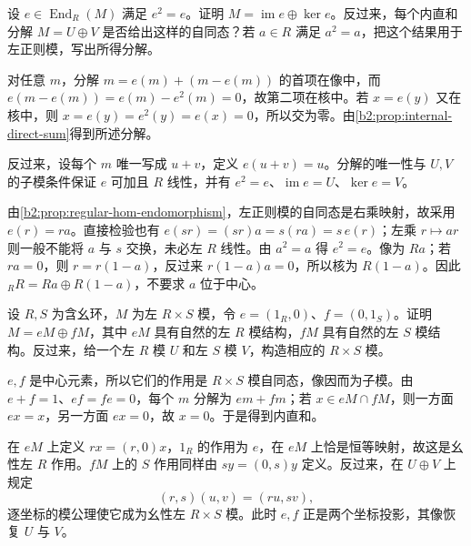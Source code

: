 \begin{exercise}\label{b2:ex:02-idempotent-decomposition}
	设 \(e\in\operatorname{End}_R(M)\) 满足 \(e^2=e\)。证明 \(M=\operatorname{im}e\oplus\ker e\)。反过来，每个内直和分解 \(M=U\oplus V\) 是否给出这样的自同态？若 \(a\in R\) 满足 \(a^2=a\)，把这个结果用于左正则模，写出所得分解。
\end{exercise}
\begin{solution}
	对任意 \(m\)，分解 \(m=e(m)+(m-e(m))\) 的首项在像中，而 \(e(m-e(m))=e(m)-e^2(m)=0\)，故第二项在核中。若 \(x=e(y)\) 又在核中，则 \(x=e(y)=e^2(y)=e(x)=0\)，所以交为零。由\cref{b2:prop:internal-direct-sum}得到所述分解。

	反过来，设每个 \(m\) 唯一写成 \(u+v\)，定义 \(e(u+v)=u\)。分解的唯一性与 \(U,V\) 的子模条件保证 \(e\) 可加且 \(R\) 线性，并有 \(e^2=e\)、\(\operatorname{im}e=U\)、\(\ker e=V\)。

	由\cref{b2:prop:regular-hom-endomorphism}，左正则模的自同态是右乘映射，故采用 \(e(r)=ra\)。直接检验也有 \(e(sr)=(sr)a=s(ra)=s\,e(r)\)；左乘 \(r\mapsto ar\) 则一般不能将 \(a\) 与 \(s\) 交换，未必左 \(R\) 线性。由 \(a^2=a\) 得 \(e^2=e\)。像为 \(Ra\)；若 \(ra=0\)，则 \(r=r(1-a)\)，反过来 \(r(1-a)a=0\)，所以核为 \(R(1-a)\)。因此 \({}_RR=Ra\oplus R(1-a)\)，不要求 \(a\) 位于中心。
\end{solution}

\begin{exercise}\label{b2:ex:02-product-ring-module}
	设 \(R,S\) 为含幺环，\(M\) 为左 \(R\times S\) 模，令 \(e=(1_R,0)\)、\(f=(0,1_S)\)。证明 \(M=eM\oplus fM\)，其中 \(eM\) 具有自然的左 \(R\) 模结构，\(fM\) 具有自然的左 \(S\) 模结构。反过来，给一个左 \(R\) 模 \(U\) 和左 \(S\) 模 \(V\)，构造相应的 \(R\times S\) 模。
\end{exercise}
\begin{solution}
	\(e,f\) 是中心元素，所以它们的作用是 \(R\times S\) 模自同态，像因而为子模。由 \(e+f=1\)、\(ef=fe=0\)，每个 \(m\) 分解为 \(em+fm\)；若 \(x\in eM\cap fM\)，则一方面 \(ex=x\)，另一方面 \(ex=0\)，故 \(x=0\)。于是得到内直和。

	在 \(eM\) 上定义 \(r x=(r,0)x\)，\(1_R\) 的作用为 \(e\)，在 \(eM\) 上恰是恒等映射，故这是幺性左 \(R\) 作用。\(fM\) 上的 \(S\) 作用同样由 \(s y=(0,s)y\) 定义。反过来，在 \(U\oplus V\) 上规定
	\[
		(r,s)(u,v)=(ru,sv),
	\]
	逐坐标的模公理使它成为幺性左 \(R\times S\) 模。此时 \(e,f\) 正是两个坐标投影，其像恢复 \(U\) 与 \(V\)。
\end{solution}
